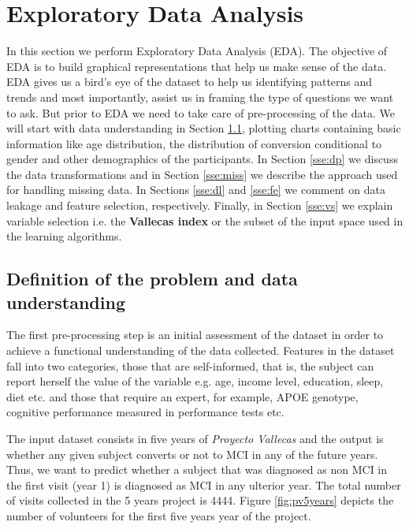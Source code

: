 \documentclass[11pt]{article}
\theoremstyle{definition}
\theoremstyle{remark}
\begin{document}
\section{Exploratory Data Analysis}
\label{se:eda}
In this section we perform Exploratory Data Analysis (EDA). The objective of EDA is to build graphical representations that help us make sense of the data. EDA gives us a bird's eye of the dataset to help us identifying patterns and trends and most importantly, assist us in framing the type of  questions we want to ask.
But prior to EDA we need to take care of pre-processing of the data. We will start with data understanding in Section \ref{sse:biz}, plotting charts containing basic information like age distribution, the distribution of conversion conditional to gender and other demographics of the participants. In Section \ref{sse:dp} we discuss the data transformations and in Section \ref{sse:miss} we describe the approach used for handling missing data. In Sections \ref{sse:dl} and \ref{sse:fe} we comment on data leakage and feature selection, respectively. Finally, in Section \ref{sse:vs} we explain variable selection i.e. the \textbf{Vallecas index} or the subset of the input space used in the learning algorithms.


\subsection{Definition of the problem and data understanding}
\label{sse:biz}
The first pre-processing step is an initial assessment of the dataset in order to achieve a functional understanding of the data collected. Features in the dataset fall into two categories, those that are self-informed, that is, the subject can report herself the value of the variable e.g. age, income level, education, sleep, diet etc. and those that require an expert, for example, APOE genotype, cognitive performance measured in performance tests etc.

The input dataset consists in five years of \emph{Proyecto Vallecas} and the output is whether any given subject converts or not to MCI in any of the future years. Thus, we want to predict whether a subject that was diagnosed as non MCI in the first visit (year 1) is diagnosed as MCI in any ulterior year. The total number of visits collected in the 5 years project is 4444. Figure \ref{fig:pv5years} depicts the number of volunteers for the first five years year of the project.
\end{document}
